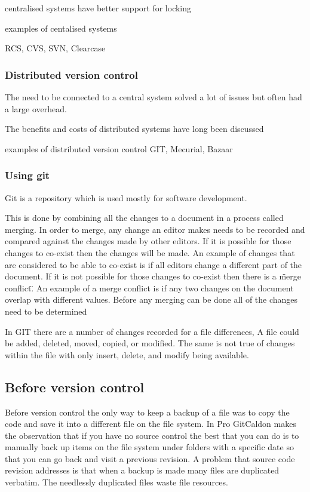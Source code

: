 centralised systems have better support for locking  

examples of centalised systems

RCS, CVS, SVN, Clearcase

\subsubsection{Distributed version control}
The need to be connected to a central system solved a lot of issues but often had a large overhead.  


The benefits and costs of distributed systems have long been discussed

examples of distributed version control
GIT, Mecurial, Bazaar


\subsubsection{Using git}
Git is a repository which is used mostly for software development.

This is done by combining all the changes to a document in a process called merging. 
In order to merge, any change an editor makes needs to be recorded and compared against the changes made by other editors.
If it is possible for those changes to co-exist then the changes will be made.
An example of changes that are considered to be able to co-exist is if all editors change a different part of the document.
If it is not possible for those changes to co-exist then there is a \"merge conflict\".
An example of a merge conflict is if any two changes on the document overlap with different values.
Before any merging can be done all of the changes need to be determined

In GIT there are a number of changes recorded for a file differences,  A file could be added, deleted, moved, copied, or modified.  The same is not true of changes within the file with only insert, delete, and modify being available.

\subsection{Before version control}
Before version control the only way to keep a backup of a file was to copy the code and save it into a different file on the file system.
In \"Pro Git\" Caldon makes the observation that if you have no source control the best that you can do is to manually back up items on the file system under folders with a specific date so that you can go back and visit a previous revision.  A problem that source code revision addresses is that when a backup is made many files are duplicated verbatim.  The needlessly duplicated files waste file resources.

